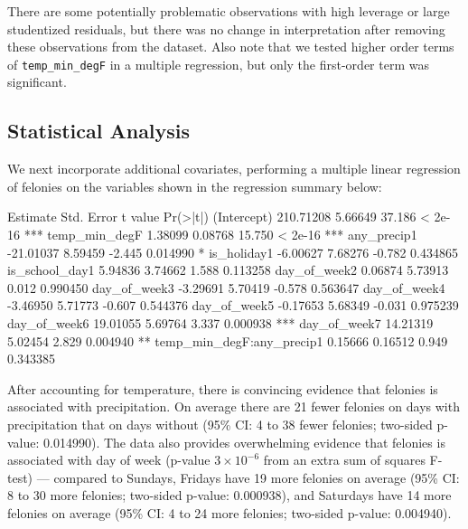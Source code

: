 \documentclass[11pt,notitlepage]{article}
\newenvironment{codeSmall}%
   {\par\noindent\adjustbox{margin=1ex,bgcolor=shadecolor,margin=0ex \medskipamount}\bgroup\minipage\linewidth\verbatim\footnotesize}%
   {\endverbatim\endminipage\egroup}
\begin{document}
There are some potentially problematic observations with high leverage or large studentized residuals, but there was no change in interpretation after removing these observations from the dataset. Also note that we tested higher order terms of \texttt{temp_min_degF} in a multiple regression, but only the first-order term was significant.


\subsection{Statistical Analysis}
\label{sec:modelFeloniesMultipleRegression}

We next incorporate additional covariates, performing a multiple linear regression of felonies on the variables shown in the regression summary below:

\begin{codeSmall}
                           Estimate Std. Error t value Pr(>|t|)    
(Intercept)               210.71208    5.66649  37.186  < 2e-16 ***
temp_min_degF               1.38099    0.08768  15.750  < 2e-16 ***
any_precip1               -21.01037    8.59459  -2.445 0.014990 *  
is_holiday1                -6.00627    7.68276  -0.782 0.434865    
is_school_day1              5.94836    3.74662   1.588 0.113258    
day_of_week2                0.06874    5.73913   0.012 0.990450    
day_of_week3               -3.29691    5.70419  -0.578 0.563647    
day_of_week4               -3.46950    5.71773  -0.607 0.544376    
day_of_week5               -0.17653    5.68349  -0.031 0.975239    
day_of_week6               19.01055    5.69764   3.337 0.000938 ***
day_of_week7               14.21319    5.02454   2.829 0.004940 ** 
temp_min_degF:any_precip1   0.15666    0.16512   0.949 0.343385    
\end{codeSmall}


After accounting for temperature, there is convincing evidence that felonies is associated with precipitation. On average there are 21 fewer felonies on days with precipitation that on days without (95\% CI: 4 to 38 fewer felonies; two-sided p-value: 0.014990). The data also provides overwhelming evidence that felonies is associated with day of week (p-value $3 \times 10^{-6}$ from an extra sum of squares F-test) --- compared to Sundays, Fridays have 19 more felonies on average (95\% CI: 8 to 30 more felonies; two-sided p-value: 0.000938), and Saturdays have 14 more felonies on average (95\% CI: 4 to 24 more felonies; two-sided p-value: 0.004940).
\end{document}
